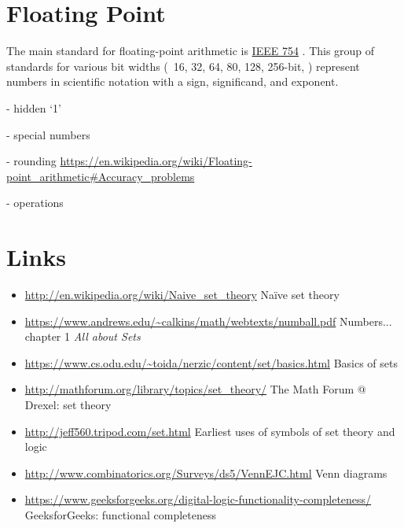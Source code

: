 \documentclass[11pt]{article}%
\begin{document}
\begin{multicols}{2}
\section{Floating Point}
\label{FloatingPoint}


The main standard for floating-point arithmetic is \href{https://en.wikipedia.org/wiki/IEEE_754}{IEEE 754} \citep{wiki:ieee-754}. This group of standards for various bit widths (\eg\ 16, 32, 64, 80, 128, 256-bit, \etc) represent numbers in scientific notation with a sign, significand, and exponent. 

- hidden `1'

- special numbers

- rounding \url{https://en.wikipedia.org/wiki/Floating-point_arithmetic#Accuracy_problems}

- operations

\section{Links}
\label{Links}

\begin{itemize}

\item \url{http://en.wikipedia.org/wiki/Naive_set_theory} Na\"ive set
theory

\item \url{https://www.andrews.edu/~calkins/math/webtexts/numball.pdf}
Numbers... chapter 1 \textit{All about Sets}

\item \url{https://www.cs.odu.edu/~toida/nerzic/content/set/basics.html} Basics of sets

\item \url{http://mathforum.org/library/topics/set_theory/} The Math
Forum @ Drexel: set theory

\item \url{http://jeff560.tripod.com/set.html} Earliest uses of
symbols of set theory and logic

\item \url{http://www.combinatorics.org/Surveys/ds5/VennEJC.html}
Venn diagrams

\item \url{https://www.geeksforgeeks.org/digital-logic-functionality-completeness/} GeeksforGeeks: functional completeness


\end{itemize}
\end{multicols}
\end{document}
